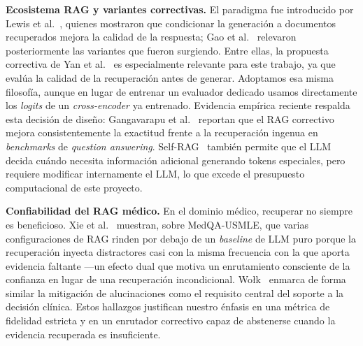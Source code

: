 \documentclass[runningheads]{llncs}
\begin{document}
\textbf{Ecosistema RAG y variantes correctivas.} El paradigma fue introducido por Lewis et al.~\cite{lewis2020retrieval}, quienes mostraron que condicionar la generaci\'{o}n a documentos recuperados mejora la calidad de la respuesta; Gao et al.~\cite{gao2024retrieval} relevaron posteriormente las variantes que fueron surgiendo. Entre ellas, la propuesta correctiva de Yan et al.~\cite{yan2024crag} es especialmente relevante para este trabajo, ya que eval\'{u}a la calidad de la recuperaci\'{o}n antes de generar. Adoptamos esa misma filosof\'{i}a, aunque en lugar de entrenar un evaluador dedicado usamos directamente los \emph{logits} de un \emph{cross-encoder} ya entrenado. Evidencia emp\'{i}rica reciente respalda esta decisi\'{o}n de dise\~{n}o: Gangavarapu et al.~\cite{gangavarapu2025corrective} reportan que el RAG correctivo mejora consistentemente la exactitud frente a la recuperaci\'{o}n ingenua en \emph{benchmarks} de \emph{question answering}. Self-RAG~\cite{asai2024selfrag} tambi\'{e}n permite que el LLM decida cu\'{a}ndo necesita informaci\'{o}n adicional generando tokens especiales, pero requiere modificar internamente el LLM, lo que excede el presupuesto computacional de este proyecto.

\textbf{Confiabilidad del RAG m\'{e}dico.} En el dominio m\'{e}dico, recuperar no siempre es beneficioso. Xie et al.~\cite{xie2026retrievalhurts} muestran, sobre MedQA-USMLE, que varias configuraciones de RAG rinden por debajo de un \emph{baseline} de LLM puro porque la recuperaci\'{o}n inyecta distractores casi con la misma frecuencia con la que aporta evidencia faltante ---un efecto dual que motiva un enrutamiento consciente de la confianza en lugar de una recuperaci\'{o}n incondicional. Wo{\l}k~\cite{wolk2025clinical} enmarca de forma similar la mitigaci\'{o}n de alucinaciones como el requisito central del soporte a la decisi\'{o}n cl\'{i}nica. Estos hallazgos justifican nuestro \'{e}nfasis en una m\'{e}trica de fidelidad estricta y en un enrutador correctivo capaz de abstenerse cuando la evidencia recuperada es insuficiente.
\end{document}
